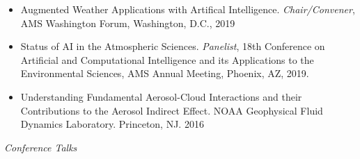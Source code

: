 \documentclass[11pt,letterpaper]{article}
\begin{document}
\begin{itemize}[itemindent=-10pt]
 \item Augmented Weather Applications with Artifical Intelligence. \textit{Chair/Convener}, AMS Washington Forum, Washington, D.C., 2019

 \item Status of AI in the Atmospheric Sciences. \textit{Panelist}, 18th Conference on Artificial and Computational Intelligence and its Applications to the Environmental Sciences, AMS Annual Meeting, Phoenix, AZ, 2019.
  
 \item Understanding Fundamental Aerosol-Cloud Interactions and their Contributions to the Aerosol Indirect Effect. NOAA Geophysical Fluid Dynamics Laboratory. Princeton, NJ. 2016
\end{itemize}

\bigskip
\emph{Conference Talks}
\medskip
\end{document}
